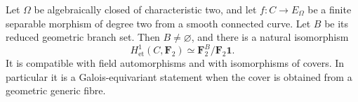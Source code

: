 \begin{lemma}
\label{lem:root-double-cover-branch-module}
Let \(\Omega\) be algebraically closed of characteristic two,
and let \(f:C\to E_\Omega\) be a finite separable morphism
of degree two from a smooth connected curve. Let \(B\) be its
reduced geometric branch set. Then \(B\ne\varnothing\), and
there is a natural isomorphism
\[
              H^1_{\mathrm{et}}(C,\mathbf F_2)
                   \simeq \mathbf F_2^B/\mathbf F_2\mathbf1.
                                                        \tag{EDC6}
\]
It is compatible with field automorphisms and with isomorphisms
of covers. In particular it is a Galois-equivariant statement
when the cover is obtained from a geometric generic fibre.
\end{lemma}

